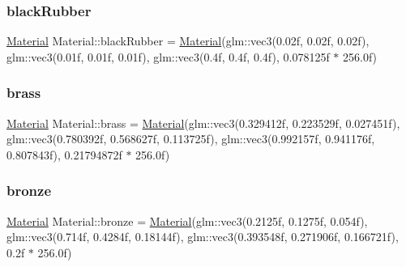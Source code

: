\mbox{\label{struct_material_a0772c33ab6f82b876232153661a64c76}} 
\subsubsection{\texorpdfstring{blackRubber}{blackRubber}}
{\footnotesize\ttfamily \mbox{\hyperlink{struct_material}{Material}} Material\+::black\+Rubber = \mbox{\hyperlink{struct_material}{Material}}(glm\+::vec3(0.\+02f, 0.\+02f, 0.\+02f), glm\+::vec3(0.\+01f, 0.\+01f, 0.\+01f), glm\+::vec3(0.\+4f, 0.\+4f, 0.\+4f), 0.\+078125f $\ast$ 256.\+0f)\hspace{0.3cm}{\ttfamily [static]}}

\mbox{\label{struct_material_a9db90c13365c8487d52c24bb2ab1882b}} 
\subsubsection{\texorpdfstring{brass}{brass}}
{\footnotesize\ttfamily \mbox{\hyperlink{struct_material}{Material}} Material\+::brass = \mbox{\hyperlink{struct_material}{Material}}(glm\+::vec3(0.\+329412f, 0.\+223529f, 0.\+027451f), glm\+::vec3(0.\+780392f, 0.\+568627f, 0.\+113725f), glm\+::vec3(0.\+992157f, 0.\+941176f, 0.\+807843f), 0.\+21794872f $\ast$ 256.\+0f)\hspace{0.3cm}{\ttfamily [static]}}

\mbox{\label{struct_material_ac43b7a8224541fce0de9de18ff4add8c}} 
\subsubsection{\texorpdfstring{bronze}{bronze}}
{\footnotesize\ttfamily \mbox{\hyperlink{struct_material}{Material}} Material\+::bronze = \mbox{\hyperlink{struct_material}{Material}}(glm\+::vec3(0.\+2125f, 0.\+1275f, 0.\+054f), glm\+::vec3(0.\+714f, 0.\+4284f, 0.\+18144f), glm\+::vec3(0.\+393548f, 0.\+271906f, 0.\+166721f), 0.\+2f $\ast$ 256.\+0f)\hspace{0.3cm}{\ttfamily [static]}}

\mbox{\label{struct_material_a49a439730bf4934813e885d6458e496d}} 

